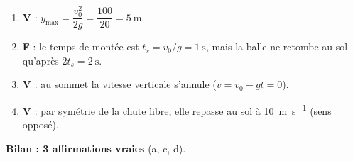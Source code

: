 \documentclass[11pt,a4paper]{article}
\begin{document}
\begin{corrige}
\begin{enumerate}[label=\alph*)]
  \item \textbf{V} : $y_{\max}=\dfrac{v_0^2}{2g}=\dfrac{100}{20}=\qty{5}{\metre}$.
  \item \textbf{F} : le temps de montée est $t_s=v_0/g=\qty{1}{\second}$, mais la balle ne retombe au sol qu'après $2t_s=\qty{2}{\second}$.
  \item \textbf{V} : au sommet la vitesse verticale s'annule ($v=v_0-gt=0$).
  \item \textbf{V} : par symétrie de la chute libre, elle repasse au sol à \qty{10}{\metre\per\second} (sens opposé).
\end{enumerate}
\textbf{Bilan : 3 affirmations vraies} (a, c, d).
\end{corrige}
\end{document}
